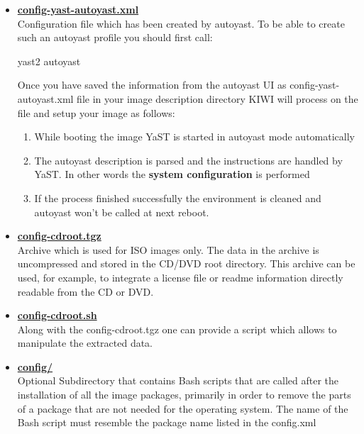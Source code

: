 \begin{itemize}
\item \textbf{\underline{config-yast-autoyast.xml}}\\
      Configuration file which has been created by autoyast.
      To be able to create such an autoyast profile you should first
      call:

      \begin{Command}{8cm}
      yast2 autoyast
      \end{Command}

      Once you have saved the information from the autoyast UI as
      config-yast-autoyast.xml file in your image description directory KIWI
      will process on the file and setup your image as follows:
      \begin{enumerate}
      \item While booting the image YaST is started in autoyast mode
            automatically
      \item The autoyast description is parsed and the instructions are
            handled by YaST. In other words the \textbf{system configuration}
            is performed
      \item If the process finished successfully the environment is
            cleaned and autoyast won't be called at next reboot.
      \end{enumerate}

\item \textbf{\underline{config-cdroot.tgz}}\\
      Archive which is used for ISO images only. The data in the archive is
      uncompressed and stored in the CD/DVD root directory. This
      archive can be used, for example, to integrate a license file or
      readme information directly readable from the CD or DVD.

\item \textbf{\underline{config-cdroot.sh}}\\
      Along with the config-cdroot.tgz one can provide a script which allows
      to manipulate the extracted data.

\item \textbf{\underline{config/}}\\
      Optional Subdirectory that contains Bash scripts that are called
      after the installation of all the image packages, primarily in order
      to remove the parts of a package that are not needed for the operating
      system. The name of the Bash script must resemble the package name
      listed in the config.xml
\end{itemize}

